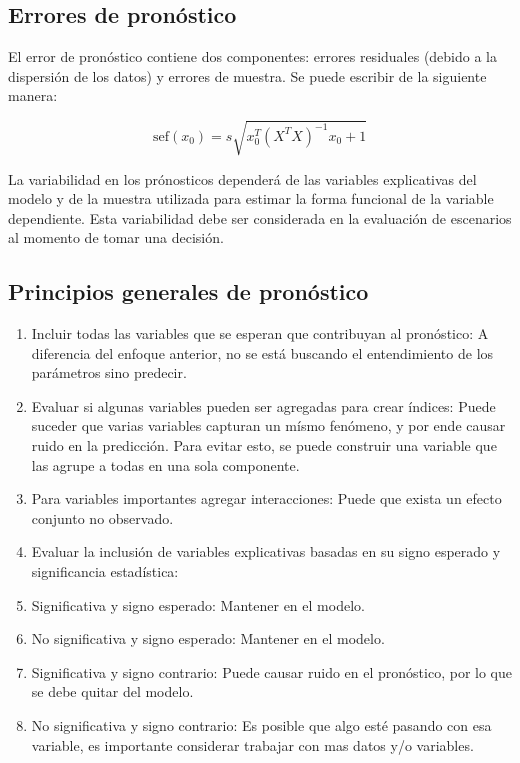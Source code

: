 \documentclass[
]{book}
\providecommand{\tightlist}{%
  \setlength{\itemsep}{0pt}\setlength{\parskip}{0pt}}
\begin{document}
\hypertarget{errores-de-pronuxf3stico}{%
\subsection{Errores de pronóstico}\label{errores-de-pronuxf3stico}}

El error de pronóstico contiene dos componentes: errores residuales
(debido a la dispersión de los datos) y errores de muestra. Se puede
escribir de la siguiente manera:

\[\text{sef}(x_0) = s\sqrt{x_0^T(X^TX)^{-1}x_0 + 1}\]

La variabilidad en los prónosticos dependerá de las variables
explicativas del modelo y de la muestra utilizada para estimar la forma
funcional de la variable dependiente. Esta variabilidad debe ser
considerada en la evaluación de escenarios al momento de tomar una
decisión.

\hypertarget{principios-generales-de-pronuxf3stico}{%
\subsection{Principios generales de pronóstico}\label{principios-generales-de-pronuxf3stico}}

\begin{enumerate}
\def\labelenumi{\arabic{enumi}.}
\tightlist
\item
  Incluir todas las variables que se esperan que contribuyan al
  pronóstico: A diferencia del enfoque anterior, no se está buscando
  el entendimiento de los parámetros sino predecir.
\item
  Evaluar si algunas variables pueden ser agregadas para crear
  índices: Puede suceder que varias variables capturan un mísmo
  fenómeno, y por ende causar ruido en la predicción. Para evitar
  esto, se puede construir una variable que las agrupe a todas en una
  sola componente.
\item
  Para variables importantes agregar interacciones: Puede que exista
  un efecto conjunto no observado.
\item
  Evaluar la inclusión de variables explicativas basadas en su signo
  esperado y significancia estadística:
\item
  Significativa y signo esperado: Mantener en el modelo.
\item
  No significativa y signo esperado: Mantener en el modelo.
\item
  Significativa y signo contrario: Puede causar ruido en el
  pronóstico, por lo que se debe quitar del modelo.
\item
  No significativa y signo contrario: Es posible que algo esté pasando
  con esa variable, es importante considerar trabajar con mas datos
  y/o variables.
\end{enumerate}
\end{document}
